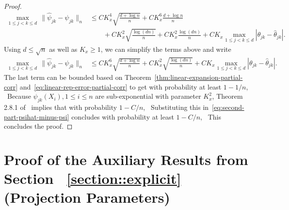 \documentclass{article}
\begin{document}
\begin{appendices}
\begin{proof}
 \begin{equation}
 \begin{split}
 \max_{1\le j < k\le d}\,\|\widehat{\psi}_{jk} - \psi_{jk}\|_n &\le CK_x^4\sqrt{\frac{d + \log n}{n}} + CK_x^6\frac{d + \log n}{n}\\
 &\qquad+ CK_x^2\sqrt{\frac{\log(dn)}{n}} + CK_x^2\frac{\log(dn)}{n} + CK_x\max_{1\le j < k\le d}|\theta_{jk} - \widehat{\theta}_{jk}|.
 \end{split}
 \end{equation}
 Using  $d \le \sqrt{n}$ as well as $K_x \ge 1$, we can simplify the terms above and write
 \begin{equation}\label{eq:second-part-psihat-minus-psi}
 \begin{split}
 \max_{1\le j < k\le d}\,\|\widehat{\psi}_{jk} - \psi_{jk}\|_n &\le CK_x^6\sqrt{\frac{d + \log n}{n}} + CK_x^2\sqrt{\frac{\log(dn)}{n}} + CK_x\max_{1\le j < k\le d}|\theta_{jk} - \widehat{\theta}_{jk}|.
 \end{split}
 \end{equation}
 The last term can be bounded based on Theorem~\ref{thm:linear-expansion-partial-corr} and~\eqref{eq:linear-rep-error-partial-corr} to get with probability at least $1 - 1/n$,
 \
 Because $\psi_{jk}(X_i), 1\le i\le n$ are sub-exponential with parameter $K_x^2$, Theorem 2.8.1 of~\cite{Vershynin18} implies that with probability $1 - C/n$,
 \
 Substituting this in~\eqref{eq:second-part-psihat-minus-psi} concludes with probability at least $1 - C/n$,
 \
 This concludes the proof.
 \end{proof}
 
 
 
 
 
 
 
 \section{Proof of the Auxiliary Results from Section ~\ref{section::explicit} (Projection Parameters)}
 \label{appendix:auxiliary.ols}
 

\end{appendices}
\end{document}
